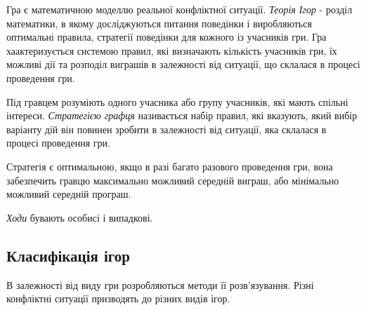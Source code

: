 \documentclass[12pt,a4paper]{article}
\begin{document}
Гра є математичною моделлю реальної конфліктної ситуації. \emph{Теорія Ігор} - розділ математики, в якому досліджуються питання поведінки і виробляються оптимальні правила, стратегії поведінки для кожного із учасників гри. Гра хаактеризується системою правил, які визначають кількість учасників гри, їх можливі дії та розподіл виграшів в залежності від ситуації, що склалася в процесі проведення гри.

Під гравцем розуміють одного учасника або групу учасників, які мають спільні інтереси. \emph{Стратегією графця} називається набір правил, які вказують, який вибір варіанту дій він повинен зробити в залежності від ситуації, яка склалася в процесі проведення гри.

Стратегія є оптимальною, якщо в разі багато разового проведення гри, вона забезпечить гравцю максимально можливий середній виграш, або мінімально можливий середній програш.

\emph{Ходи} бувають особисі і випадкові.

\subsection*{Класифікація ігор}

В залежності від виду гри розробляються методи її розв'язування. Різні конфліктні ситуації призводять до різних видів ігор.
\end{document}
